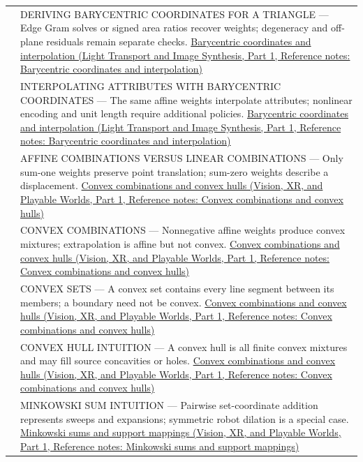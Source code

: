 {\begin{longtable}[]{@{}
  >{\raggedright\arraybackslash}p{}
  >{\raggedright\arraybackslash}p{}@{}}
569 & DERIVING BARYCENTRIC COORDINATES FOR A TRIANGLE --- Edge Gram solves or signed area ratios recover weights; degeneracy and off-plane residuals remain separate checks. \href{../04-Light-Transport-and-Image-Synthesis-P01/main.pdf\#nameddest=appendix-02b9d9a81dca}{Barycentric coordinates and interpolation (Light Transport and Image Synthesis, Part 1, Reference notes: Barycentric coordinates and interpolation)} \\
570 & INTERPOLATING ATTRIBUTES WITH BARYCENTRIC COORDINATES --- The same affine weights interpolate attributes; nonlinear encoding and unit length require additional policies. \href{../04-Light-Transport-and-Image-Synthesis-P01/main.pdf\#nameddest=appendix-02b9d9a81dca}{Barycentric coordinates and interpolation (Light Transport and Image Synthesis, Part 1, Reference notes: Barycentric coordinates and interpolation)} \\
571 & AFFINE COMBINATIONS VERSUS LINEAR COMBINATIONS --- Only sum-one weights preserve point translation; sum-zero weights describe a displacement. \href{../07-Vision-XR-and-Playable-Worlds-P01/main.pdf\#nameddest=appendix-0026ec42c9d5}{Convex combinations and convex hulls (Vision, XR, and Playable Worlds, Part 1, Reference notes: Convex combinations and convex hulls)} \\
572 & CONVEX COMBINATIONS --- Nonnegative affine weights produce convex mixtures; extrapolation is affine but not convex. \href{../07-Vision-XR-and-Playable-Worlds-P01/main.pdf\#nameddest=appendix-0026ec42c9d5}{Convex combinations and convex hulls (Vision, XR, and Playable Worlds, Part 1, Reference notes: Convex combinations and convex hulls)} \\
573 & CONVEX SETS --- A convex set contains every line segment between its members; a boundary need not be convex. \href{../07-Vision-XR-and-Playable-Worlds-P01/main.pdf\#nameddest=appendix-0026ec42c9d5}{Convex combinations and convex hulls (Vision, XR, and Playable Worlds, Part 1, Reference notes: Convex combinations and convex hulls)} \\
574 & CONVEX HULL INTUITION --- A convex hull is all finite convex mixtures and may fill source concavities or holes. \href{../07-Vision-XR-and-Playable-Worlds-P01/main.pdf\#nameddest=appendix-0026ec42c9d5}{Convex combinations and convex hulls (Vision, XR, and Playable Worlds, Part 1, Reference notes: Convex combinations and convex hulls)} \\
575 & MINKOWSKI SUM INTUITION --- Pairwise set-coordinate addition represents sweeps and expansions; symmetric robot dilation is a special case. \href{../07-Vision-XR-and-Playable-Worlds-P01/main.pdf\#nameddest=appendix-215ac7099a82}{Minkowski sums and support mappings (Vision, XR, and Playable Worlds, Part 1, Reference notes: Minkowski sums and support mappings)} \\

\end{longtable}}
